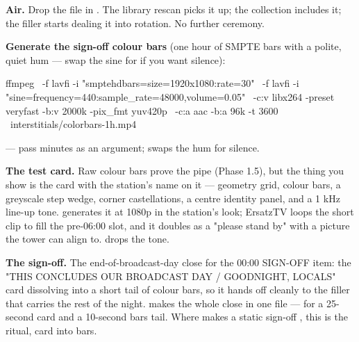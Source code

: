 \documentclass[fontpath=fonts/,logopath=logo/]{riposte-doc}
\begin{document}
\begin{ripnumbers}
\item \textbf{Air.} Drop the file in . The library rescan picks it up; the  collection includes it; the  filler starts dealing it into rotation. No further ceremony.
\end{ripnumbers}



\textbf{Generate the sign-off colour bars} (one hour of SMPTE bars with a polite, quiet hum — swap the sine for  if you want silence):

\ripcodeopen
{}
\begin{ripcodeblock}
ffmpeg \
  -f lavfi -i "smptehdbars=size=1920x1080:rate=30" \
  -f lavfi -i "sine=frequency=440:sample_rate=48000,volume=0.05" \
  -c:v libx264 -preset veryfast -b:v 2000k -pix_fmt yuv420p \
  -c:a aac -b:a 96k -t 3600 \
  interstitials/colorbars-1h.mp4
\end{ripcodeblock}
\ripcodesizereset\ripcodeclose

\ripmarker{}   — pass minutes as an argument;  swaps the hum for silence.

\textbf{The test card.} Raw colour bars prove the pipe (Phase 1.5), but the thing you show  is the card with the station's name on it — geometry grid, colour bars, a greyscale step wedge, corner castellations, a centre identity panel, and a 1 kHz line-up tone.  generates it at 1080p in the station's look; ErsatzTV loops the short clip to fill the pre-06:00 slot, and it doubles as a "please stand by" with a picture the tower can align to.  drops the tone.

\textbf{The sign-off.} The end-of-broadcast-day close for the 00:00 SIGN-OFF item: the "THIS CONCLUDES OUR BROADCAST DAY / GOODNIGHT, LOCALS" card dissolving into a short tail of colour bars, so it hands off cleanly to the  filler that carries the rest of the night.  makes the whole close in one file —  for a 25-second card and a 10-second bars tail. Where  makes a static sign-off , this is the ritual, card into bars.
\end{document}
